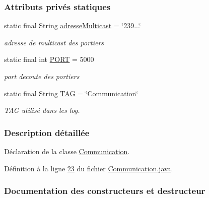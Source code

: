 \subsubsection*{Attributs privés statiques}
\begin{DoxyCompactItemize}
\item 
static final String \hyperlink{classcom_1_1lasalle_1_1meeting_1_1_communication_a6a2d2e62f87bef261a1999eb5acf8abb}{adresse\+Multicast} = \char`\"{}239...\char`\"{}
\begin{DoxyCompactList}\small\item\em adresse de multicast des portiers \end{DoxyCompactList}\item 
static final int \hyperlink{classcom_1_1lasalle_1_1meeting_1_1_communication_abf48fd6a29d87d67f4941494404f1ea7}{P\+O\+RT} = 5000
\begin{DoxyCompactList}\small\item\em port d\textquotesingle{}ecoute des portiers \end{DoxyCompactList}\item 
static final String \hyperlink{classcom_1_1lasalle_1_1meeting_1_1_communication_a5d58f88df1f20b4d61edbed9a82eccab}{T\+AG} = \char`\"{}Communication\char`\"{}
\begin{DoxyCompactList}\small\item\em T\+AG utilisé dans les log. \end{DoxyCompactList}\end{DoxyCompactItemize}


\subsubsection{Description détaillée}
Déclaration de la classe \hyperlink{classcom_1_1lasalle_1_1meeting_1_1_communication}{Communication}. 

Définition à la ligne \hyperlink{_communication_8java_source_l00023}{23} du fichier \hyperlink{_communication_8java_source}{Communication.\+java}.



\subsubsection{Documentation des constructeurs et destructeur}
\mbox{\label{classcom_1_1lasalle_1_1meeting_1_1_communication_a3d73554b2774d3274ad385b0faa27d14}} 
